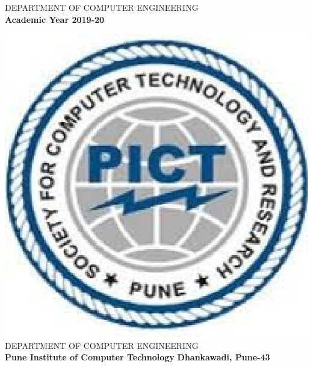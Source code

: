 \documentclass[a4paper, 12pt]{article}
\begin{document}
\begin{titlepage}
\begin{center}
        \Large
        DEPARTMENT OF COMPUTER ENGINEERING\\
        
		\textbf{Academic Year 2019-20}
        
    \end{center}
\end{titlepage}
\pagebreak

\begin{titlepage}
\begin{center}
    \includegraphics[scale=0.6]{pict} 
	\linebreak
	\Large
        DEPARTMENT OF COMPUTER ENGINEERING\\
        \textbf{Pune Institute of Computer Technology}
		\linebreak
		\textbf{Dhankawadi, Pune-43}
		\vspace{0.8cm}
		\Large
		

\end{center}
\end{titlepage}
\end{document}
